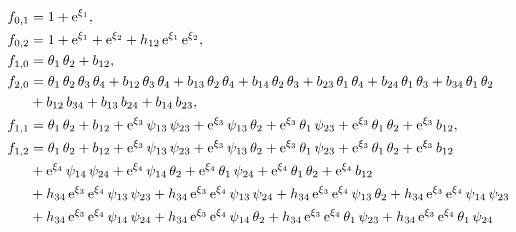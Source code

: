 \documentclass[12pt,a4paper,UTF8]{article}
\numberwithin{equation}{section}
\begin{document}
\begin{equation*}
\begin{aligned}
f_{0,1}&=1+{\rm e}^{{{\xi}_{1}}} ,\\ 
f_{0,2}&=1+{\rm e}^{{{\xi}_{1}}}+{\rm e}^{{{\xi}_{2}}}+{{h}_{12}}\,{\rm e}^{{{\xi}_{1}}}\,{\rm e}^{{{\xi}_{2}}} ,\\ 
f_{1,0}&={{\theta}_{1}}\,{{\theta}_{2}}+{{b}_{12}} ,\\ 
f_{2,0}&={{\theta}_{1}}\,{{\theta}_{2}}\,{{\theta}_{3}}\,{{\theta}_{4}}+{{b}_{12}}\,{{\theta}_{3}}\,{{\theta}_{4}}+{{b}_{13}}\,{{\theta}_{2}}\,{{\theta}_{4}}+{{b}_{14}}\,{{\theta}_{2}}\,{{\theta}_{3}}+{{b}_{23}}\,{{\theta}_{1}}\,{{\theta}_{4}}+{{b}_{24}}\,{{\theta}_{1}}\,{{\theta}_{3}}+{{b}_{34}}\,{{\theta}_{1}}\,{{\theta}_{2}} \\
&+{{b}_{12}}\,{{b}_{34}}+{{b}_{13}}\,{{b}_{24}}+{{b}_{14}}\,{{b}_{23}} ,\\ 
f_{1,1}&={{\theta}_{1}}\,{{\theta}_{2}}+{{b}_{12}}+{\rm e}^{{{\xi}_{3}}}\,{{\psi}_{13}}\,{{\psi}_{23}}+{\rm e}^{{{\xi}_{3}}}\,{{\psi}_{13}}\,{{\theta}_{2}}+{\rm e}^{{{\xi}_{3}}}\,{{\theta}_{1}}\,{{\psi}_{23}}+{\rm e}^{{{\xi}_{3}}}\,{{\theta}_{1}}\,{{\theta}_{2}}+{\rm e}^{{{\xi}_{3}}}\,{{b}_{12}} ,\\
f_{1,2}&={{\theta}_{1}}\,{{\theta}_{2}}+{{b}_{12}}+{\rm e}^{{{\xi}_{3}}}\,{{\psi}_{13}}\,{{\psi}_{23}}+{\rm e}^{{{\xi}_{3}}}\,{{\psi}_{13}}\,{{\theta}_{2}}+{\rm e}^{{{\xi}_{3}}}\,{{\theta}_{1}}\,{{\psi}_{23}}+{\rm e}^{{{\xi}_{3}}}\,{{\theta}_{1}}\,{{\theta}_{2}}+{\rm e}^{{{\xi}_{3}}}\,{{b}_{12}}\\ 
&+{\rm e}^{{{\xi}_{4}}}\,{{\psi}_{14}}\,{{\psi}_{24}}+{\rm e}^{{{\xi}_{4}}}\,{{\psi}_{14}}\,{{\theta}_{2}}+{\rm e}^{{{\xi}_{4}}}\,{{\theta}_{1}}\,{{\psi}_{24}}+{\rm e}^{{{\xi}_{4}}}\,{{\theta}_{1}}\,{{\theta}_{2}}+{\rm e}^{{{\xi}_{4}}}\,{{b}_{12}}\\
&+{{h}_{34}}\,{\rm e}^{{{\xi}_{3}}}\,{\rm e}^{{{\xi}_{4}}}\,{{\psi}_{13}}\,{{\psi}_{23}}+{{h}_{34}}\,{\rm e}^{{{\xi}_{3}}}\,{\rm e}^{{{\xi}_{4}}}\,{{\psi}_{13}}\,{{\psi}_{24}}+{{h}_{34}}\,{\rm e}^{{{\xi}_{3}}}\,{\rm e}^{{{\xi}_{4}}}\,{{\psi}_{13}}\,{{\theta}_{2}}+{{h}_{34}}\,{\rm e}^{{{\xi}_{3}}}\,{\rm e}^{{{\xi}_{4}}}\,{{\psi}_{14}}\,{{\psi}_{23}}\\
&+{{h}_{34}}\,{\rm e}^{{{\xi}_{3}}}\,{\rm e}^{{{\xi}_{4}}}\,{{\psi}_{14}}\,{{\psi}_{24}}+{{h}_{34}}\,{\rm e}^{{{\xi}_{3}}}\,{\rm e}^{{{\xi}_{4}}}\,{{\psi}_{14}}\,{{\theta}_{2}}+{{h}_{34}}\,{\rm e}^{{{\xi}_{3}}}\,{\rm e}^{{{\xi}_{4}}}\,{{\theta}_{1}}\,{{\psi}_{23}}+{{h}_{34}}\,{\rm e}^{{{\xi}_{3}}}\,{\rm e}^{{{\xi}_{4}}}\,{{\theta}_{1}}\,{{\psi}_{24}}\\

\end{aligned}
\end{equation*}
\end{document}
